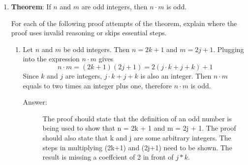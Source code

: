 \documentclass[12pt, oneside]{article}
\begin{document}
\begin{enumerate}











\item \textbf{Theorem}: If $n$ and $m$ are odd integers, then $n \cdot m$ is odd. 

For each of the following proof attempts of the theorem, explain where the proof uses invalid reasoning or skips essential steps.
\begin{enumerate}
    \item Let $n$ and $m$ be odd integers. Then $n=2k+1$ and $m=2j+1$. Plugging into the expression $n\cdot m$ gives
    \[n \cdot m = (2k+1)(2j+1)=2(j\cdot k+j+k)+1\]
    Since $k$ and $j$ are integers, $j\cdot k+j+k$ is also an integer. Then $n\cdot m$ equals to two times an integer plus one, therefore $n\cdot m$ is odd.
    
    \begin{description}
        \item[Answer:] The proof should state that the definition of an odd number is being used to show that n = 2k + 1 and m = 2j + 1. The proof should also state that k and j are some arbitrary integers. The steps in multiplying (2k+1) and (2j+1) need to be shown. The result is missing a coeffcient of 2 in front of $j * k$.
    \end{description}
    

\end{enumerate}
\end{enumerate}
\end{document}
